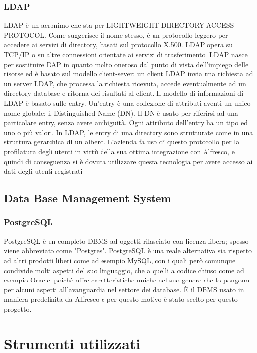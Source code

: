 \subsubsection{LDAP}
LDAP è un acronimo che sta per LIGHTWEIGHT DIRECTORY ACCESS
PROTOCOL. Come suggerisce il nome stesso, è un protocollo leggero per accedere
ai servizi di directory, basati sul protocollo X.500. LDAP opera su TCP/IP o su altre
connessioni orientate ai servizi di trasferimento. LDAP nasce per sostituire DAP in
quanto molto oneroso dal punto di vista dell’impiego delle risorse ed è basato
sul modello client-sever: un client LDAP invia una richiesta ad un server LDAP, che
processa la richiesta ricevuta, accede eventualmente ad un directory database e ritorna
dei risultati al client.
Il modello di informazioni di LDAP è basato sulle entry. Un’entry è una collezione di
attributi aventi un unico nome globale: il Distinguished Name (DN). Il DN è usato
per riferirsi ad una particolare entry, senza avere ambiguità.
Ogni attributo dell’entry ha un tipo ed uno o più valori.
In LDAP, le entry di una directory sono strutturate come in una struttura gerarchica
di un albero.
L'azienda fa uso di questo protocollo per la profilatura degli utenti in virtù della sua ottima integrazione con Alfresco, e quindi di conseguenza si è dovuta utilizzare questa tecnologia per avere accesso ai dati degli utenti registrati
\subsection{Data Base Management System}
\subsubsection{PostgreSQL}
PostgreSQL  è un completo DBMS ad oggetti rilasciato con licenza libera; spesso viene abbreviato come "Postgres".
PostgreSQL è una reale alternativa sia rispetto ad altri prodotti liberi come ad esempio MySQL, con i quali però comunque condivide molti aspetti del suo linguaggio, che a quelli a codice chiuso come ad esempio Oracle, poichè offre caratteristiche uniche nel suo genere che lo pongono per alcuni aspetti all'avanguardia nel settore dei database. È il DBMS usato in maniera predefinita da Alfresco e per questo motivo è stato scelto per questo progetto.
\section{Strumenti utilizzati}
